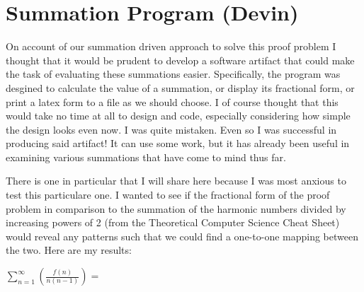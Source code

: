 \documentclass{article}
\begin{document}
\section{Summation Program (Devin)}
On account of our summation driven approach to solve this proof problem I thought that it would be prudent to develop a software artifact that could make 
the task of evaluating these summations easier. Specifically, the program was desgined to calculate the value of a summation, or display its fractional form,
or print a latex form to a file as we should choose. I of course thought that this would take no time at all to design and code, especially considering how simple
the design looks even now. I was quite mistaken. Even so I was successful in producing said artifact! It can use some work, but it has already been useful in 
examining various summations that have come to mind thus far.

There is one in particular that I will share here because I was most anxious to test this particulare one. I wanted to see if the fractional form of the proof
problem in comparison to the summation of the harmonic numbers divided by increasing powers of 2 (from the Theoretical Computer Science Cheat Sheet) would 
reveal any patterns such that we could find a one-to-one mapping between the two. Here are my results:

\bigskip
$\sum_{n=1}^\infty \left( \frac{f(n)}{n(n-1)} \right)=$
\end{document}
